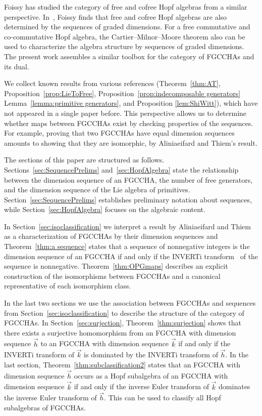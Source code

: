 \documentclass[11pt]{amsart}
\theoremstyle{definition}
\numberwithin{equation}{section}
\newcommand{\FGCCHA}{\textsf{FGCCHA}\xspace}
\newcommand{\FGCCHAs}{\textsf{FGCCHA}s\xspace}
\begin{document}
Foissy \cite{F12} has studied the category of free and cofree Hopf algebras from a similar perspective. 
In~\cite[Proposition 23]{F12}, Foissy finds that free and cofree Hopf algebras are also determined by the sequences of
graded dimensions.
For a free commutative and co-commutative Hopf algebra, the Cartier--Milnor--Moore theorem
also can be used to characterize the algebra structure by sequences of graded dimensions.
The present work assembles a similar toolbox for the category of \FGCCHAs and its dual.

We collect known results from various references (Theorem~\ref{thm:AT}, Proposition~\ref{prop:LieToFree}, Proposition~\ref{prop:indecomposable generators} Lemma~\ref{lemma:primitive generators}, and Proposition \ref{lem:ShiWitt}), which have not appeared in a single paper before.  This perspective allows us to determine whether maps between \FGCCHAs exist by checking properties of the sequences.  
For example, proving that two \FGCCHAs have equal dimension sequences amounts to showing that they are isomorphic, by Aliniaeifard and Thiem's result.

The sections of this paper are structured as follows.
Sections~\ref{sec:SequencePrelims} and~\ref{sec:HopfAlgebra} state the
relationship between the dimension sequence of an \FGCCHA, the number of free generators,
and the dimension sequence of the Lie algebra of primitives. Section~\ref{sec:SequencePrelims}
establishes preliminary notation about sequences, while Section~\ref{sec:HopfAlgebra}
focuses on the algebraic content.

In Section~\ref{sec:isoclassification} we interpret a result by
Aliniaeifard and Thiem as a characterization of \FGCCHAs by their
dimension sequences and Theorem~\ref{thm:a sequence}
states that a sequence of nonnegative integers is the 
dimension sequence of an \FGCCHA if and only if the INVERTi transform~\cite{OEIS}
of the sequence is nonnegative.
Theorem~\ref{thm:OPGmaps} describes an explicit construction of the
isomorphisms between \FGCCHAs and a canonical representative of each isomorphism class.

In the last two sections we use the association between \FGCCHAs
and sequences from Section~\ref{sec:isoclassification}
to describe the structure of the category of \FGCCHAs.
In Section~\ref{sec:surjection}, Theorem~\ref{thm:surjection} 
shows that there exists a surjective homomorphism from an \FGCCHA with
dimension sequence $\vec{h}$ to an \FGCCHA with dimension sequence 
$\vec{k}$ if and only if the INVERTi transform of $\vec{k}$ is dominated by 
the INVERTi transform of $\vec{h}$.
In the last section, Theorem~\ref{thm:subclassification2} states
that an \FGCCHA  with dimension sequence $\vec{h}$ occurs as a Hopf 
subalgebra of an \FGCCHA with dimension sequence $\vec{k}$ if and only if 
the inverse Euler transform of $\vec{k}$ dominates the inverse Euler transform of $\vec{h}$.  
This can be used to classify all Hopf subalgebras of \FGCCHAs.
\end{document}
